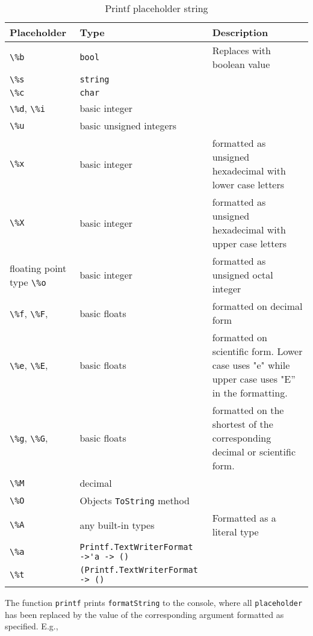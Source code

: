 \begin{table}
  \centering
  \begin{tabularx}{\linewidth}{|l|l|X|}
    \hline
    Placeholder& Type&Description\\
    \hline
    \lstinline!\%b!&\lstinline!bool!&Replaces with boolean value\\
    \hline
    \lstinline!\%s!&\lstinline!string!&\\
    \hline
    \lstinline!\%c!&\lstinline!char!&\\
    \hline
    \mbox{\lstinline!\%d!,} \mbox{\lstinline!\%i!}&basic integer&\\
    \hline
    \lstinline!\%u!&basic unsigned integers&\\
    \hline
    \lstinline!\%x!&basic integer&formatted as unsigned hexadecimal with lower case letters\\
    \hline
    \lstinline!\%X!&basic integer&formatted as unsigned hexadecimal with upper case letters\\
    \hline floating point type
    \lstinline!\%o!&basic integer&formatted as unsigned octal integer\\
    \hline
    \mbox{\lstinline!\%f!,} \mbox{\lstinline!\%F!,} &basic floats&formatted on decimal form\\
    \hline
    \mbox{\lstinline!\%e!,} \mbox{\lstinline!\%E!,} &basic floats&formatted on scientific form. Lower case uses "e" while upper case uses "E'' in the formatting.\\
    \hline
    \mbox{\lstinline!\%g!,} \mbox{\lstinline!\%G!,} &basic floats&formatted on the shortest of the corresponding decimal or scientific form.\\
    \hline
    \lstinline!\%M!&decimal&\\
    \hline
    \lstinline!\%O!&Objects \lstinline!ToString! method&\\
    \hline
    \lstinline!\%A!&any built-in types&Formatted as a literal type\\
    \hline
    \lstinline!\%a!&\lstinline[language=ebnf]!Printf.TextWriterFormat ->'a -> ()!&\\
    \hline
    \lstinline!\%t!&\lstinline[language=ebnf]!(Printf.TextWriterFormat -> ()!&\\
    \hline
  \end{tabularx}
  \caption{Printf placeholder string}
  \label{tab:printfPlaceholder}
\end{table}
The function \lstinline[language=ebnf]!printf! prints \lstinline[language=ebnf]!formatString! to the console, where all \lstinline[language=ebnf]!placeholder! has been replaced by the value of the corresponding argument formatted as specified. E.g.,
